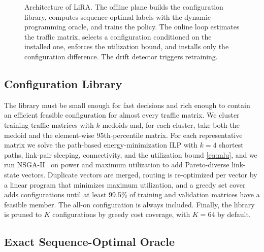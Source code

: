 \documentclass[conference]{IEEEtran}
\begin{document}
\begin{figure}[t]
{}
\caption{Architecture of LiRA. The offline plane builds the configuration library, computes sequence-optimal labels with the dynamic-programming oracle, and trains the policy. The online loop estimates the traffic matrix, selects a configuration conditioned on the installed one, enforces the utilization bound, and installs only the configuration difference. The drift detector triggers retraining.}
\label{fig:arch}
\end{figure}

\subsection{Configuration Library}\label{sec:library}

The library must be small enough for fast decisions and rich enough to contain an efficient feasible configuration for almost every traffic matrix. We cluster training traffic matrices with $k$-medoids and, for each cluster, take both the medoid and the element-wise 95th-percentile matrix. For each representative matrix we solve the path-based energy-minimization ILP with $k=4$ shortest paths, link-pair sleeping, connectivity, and the utilization bound \eqref{eq:mlu}, and we run NSGA-II~\cite{deb2002nsga2} on power and maximum utilization to add Pareto-diverse link-state vectors. Duplicate vectors are merged, routing is re-optimized per vector by a linear program that minimizes maximum utilization, and a greedy set cover adds configurations until at least 99.5\% of training and validation matrices have a feasible member. The all-on configuration is always included. Finally, the library is pruned to $K$ configurations by greedy cost coverage, with $K=64$ by default.

\subsection{Exact Sequence-Optimal Oracle}
\end{document}
